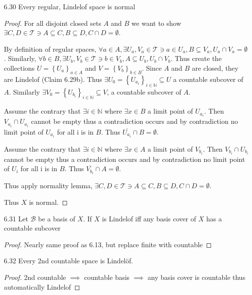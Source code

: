 \documentclass{article}
\newcommand*{\T}{\mathcal{T}}
\newcommand*{\subeq}{\subseteq}
\newcommand*{\empset}{\emptyset}
\newcommand{\N}{\mathbb{N}}
\begin{document}
\begin{claim}{6.30}\label{Claim 6.30.}
    Every regular, Lindelof space is normal
\end{claim}
\begin{proof}
    For all disjoint closed sets $A$ and $B$ we want to show $\exists C, D\in \T \ni A \subeq C, B\subeq D, C \cap D = \empset$. 
    
    By definition of regular spaces, $\forall a \in A, \exists U_a, V_a \in \T \ni a \in U_a, B \subeq V_a, U_a \cap V_a = \empset$. Similarly, $\forall b \in B, \exists U_b, V_b \in \T \ni b \in V_b, A \subeq U_b, U_b \cap V_b$.  Thus create the collections $U = \left\{ U_a \right\}_{a \in A}$ and $V = \left\{ V_{b} \right\}_{b \in B}$. Since $A$ and $B$ are closed, they are Lindelof (Claim 6.29b). Thus $\exists U_0 = \left\{ U_{a_i} \right\}_{i \in \N} \subeq U$ a countable subcover of $A$. Similarly $\exists V_0 = \left\{ U_{b_i} \right\}_{i \in \N} \subeq V$, a countable subcover of $A$.    
    
    Assume the contrary that $\exists i \in \N$ where $\exists x \in B$ a limit point of $U_{a_i}$. Then $V_{a_i} \cap U_{a_i}$ cannot be empty thus a contradiction occurs and by contradiction no limit point of $U_{a_i}$ for all i is in $B$. Thus $\overline{U_{a_i}} \cap B = \empset$. 
    
    Assume the contrary that $\exists i \in \N$ where $\exists x \in A$ a limit point of $V_{b_i}$. Then $V_{b_i} \cap U_{b_i}$ cannot be empty thus a contradiction occurs and by contradiction no limit point of $U_i$ for all i is in $B$. Thus $\overline{V_{b_i}} \cap A = \empset$.
    
    Thus apply normality lemma, $\exists C, D\in \T \ni A \subeq C, B\subeq D, C \cap D = \empset$.
    
    Thus $X$ is normal.  
\end{proof}
\bigskip

\begin{claim}{6.31}\label{Claim 6.31.}
    Let $\mathcal{B}$ be a basis of $X$. If $X$ is Lindelof iff any basis cover of $X$ has a countable subcover    
\end{claim}
\begin{proof}
    Nearly same proof as 6.13, but replace finite with countable
\end{proof}

\bigskip

\begin{claim}{6.32}\label{Claim 6.32.}
    Every 2nd countable space is Lindelöf.
\end{claim}
\begin{proof}
    2nd countable $\implies$ countable basis $\implies$ any basis cover is countable thus automatically Lindelof
\end{proof}
\end{document}
